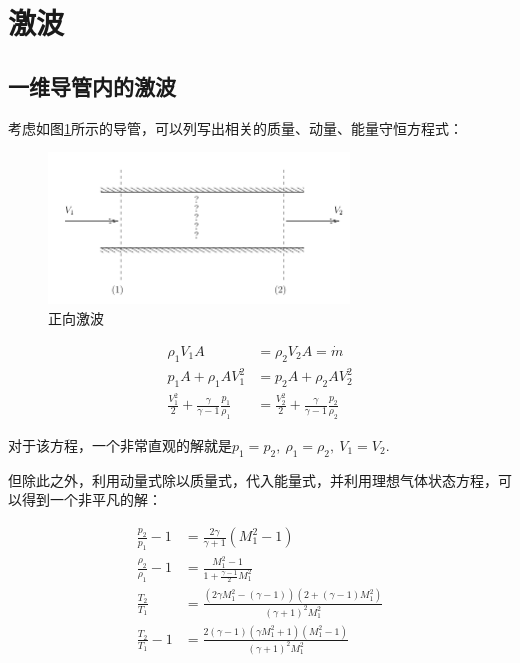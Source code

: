 \section{激波}

\subsection{一维导管内的激波}

考虑如图\ref{1}所示的导管，可以列写出相关的质量、动量、能量守恒方程式：

\begin{figure}[!ht]
    \centering
    \includegraphics[width=8cm]{figures/1.png}
    \caption{正向激波}
    \label{1}
\end{figure}

\begin{align*}
    \rho_{1} V_{1} A&=\rho_{2} V_{2} A = \dot{m} \\ 
    p_{1} A+\rho_{1} A V_{1}^{2}&=p_{2} A+\rho_{2} A V_{2}^{2}\\ 
    \frac{V_{1}^{2}}{2}+\frac{\gamma}{\gamma-1} \frac{p_{1}}{\rho_{1}}&=\frac{V_{2}^{2}}{2}+\frac{\gamma}{\gamma-1} \frac{p_{2}}{\rho_{2}}
\end{align*}

对于该方程，一个非常直观的解就是$p_1=p_2,\ \rho_1=\rho_2,\ V_1=V_2$.

但除此之外，利用动量式除以质量式，代入能量式，并利用理想气体状态方程，可以得到一个非平凡的解：

\begin{align*}
    \frac{p_{2}}{p_{1}}-1&=\frac{2 \gamma}{\gamma+1}\left(M_{1}^{2}-1\right)\\ 
    \frac{\rho_{2}}{\rho_{1}}-1&=\frac{M_{1}^{2}-1}{1+\frac{\gamma-1}{2} M_{1}^{2}}\\ 
    \frac{T_{2}}{T_{1}}&=\frac{\left(2 \gamma M_{1}^{2}-(\gamma-1)\right)\left(2+(\gamma-1) M_{1}^{2}\right)}{(\gamma+1)^{2} M_{1}^{2}}\\ 
    \frac{T_{2}}{T_{1}}-1&=\frac{2(\gamma-1)\left(\gamma M_{1}^{2}+1\right)\left(M_{1}^{2}-1\right)}{(\gamma+1)^{2} M_{1}^{2}}
\end{align*}

